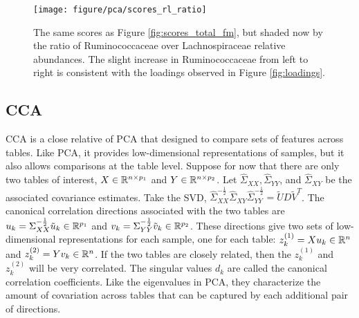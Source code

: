 \documentclass{article}
\begin{document}
\begin{figure}[ht]
  \centering
  \texttt{[image: figure/pca/scores\_rl\_ratio]}
  \caption{The same scores as Figure \ref{fig:scores_total_fm}, but shaded now by
    the ratio of Ruminococcaceae over Lachnospiraceae relative abundances. The
    slight increase in Ruminococcaceae from left to right is consistent with the
    loadings observed in Figure \ref{fig:loadings}.\label{fig:scores_rl_ratio} }
\end{figure}

\subsection{CCA}
\label{subsec:cca}

CCA is a close relative of PCA that designed to compare sets of features across
tables. Like PCA, it provides low-dimensional representations of samples, but it
also allows comparisons at the table level. Suppose for now that there are only
two tables of interest, $X \in \mathbb{R}^{n \times p_{1}}$ and $Y \in \mathbb{R}^{n
  \times p_{2}}$. Let $\hat{\Sigma}_{XX}, \hat{\Sigma}_{YY}$, and
$\hat{\Sigma}_{XY}$ be the associated covariance estimates. Take the SVD,
$\hat{\Sigma}_{XX}^{-\frac{1}{2}}\hat{\Sigma}_{XY}\hat{\Sigma}_{YY}^{-\frac{1}{2}}
= \tilde{U}D\tilde{V}^{T}$. The canonical correlation directions associated with
the two tables are $u_{k} = \Sigma_{XX}^{-\frac{1}{2}}\tilde{u}_{k} \in
\mathbb{R}^{p_{1}}$ and $v_{k} = \Sigma_{YY}^{-\frac{1}{2}}\tilde{v}_{k} \in
\mathbb{R}^{p_{2}}$. These directions give two sets of low-dimensional
representations for each sample, one for each table: $z_{k}^{(1)} = Xu_{k} \in
\mathbb{R}^{n}$ and $z_{k}^{(2)} = Yv_{k} \in \mathbb{R}^{n}$. If the two tables are
closely related, then the $z_{k}^{(1)}$ and $z_{k}^{(2)}$ will be very
correlated. The singular values $d_{k}$ are called the canonical correlation
coefficients. Like the eigenvalues in PCA, they characterize the amount of
covariation across tables that can be captured by each additional pair of
directions.
\end{document}
